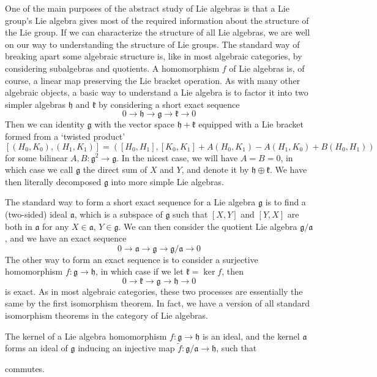 One of the main purposes of the abstract study of Lie algebras is that a Lie group's Lie algebra gives most of the required information about the structure of the Lie group. If we can characterize the structure of all Lie algebras, we are well on our way to understanding the structure of Lie groups. The standard way of breaking apart some algebraic structure is, like in most algebraic categories, by considering subalgebras and quotients. A homomorphism $f$ of Lie algebras is, of course, a linear map preserving the Lie bracket operation. As with many other algebraic objects, a basic way to understand a Lie algebra is to factor it into two simpler algebras $\mathfrak{h}$ and $\mathfrak{k}$ by considering a short exact sequence
%
\[ 0 \to \mathfrak{h} \to \mathfrak{g} \to \mathfrak{k} \to 0 \]
%
Then we can identity $\mathfrak{g}$ with the vector space $\mathfrak{h} + \mathfrak{k}$ equipped with a Lie bracket formed from a `twisted product'
%
\[ [(H_0,K_0), (H_1,K_1)] = ([H_0,H_1], [K_0,K_1] + A(H_0,K_1) - A(H_1,K_0) + B(H_0,H_1)) \]
%
for some bilinear $A,B: \mathfrak{g}^2 \to \mathfrak{g}$. In the nicest case, we will have $A = B = 0$, in which case we call $\mathfrak{g}$ the direct sum of $X$ and $Y$, and denote it by $\mathfrak{h} \oplus \mathfrak{k}$. We have then literally decomposed $\mathfrak{g}$ into more simple Lie algebras.

The standard way to form a short exact sequence for a Lie algebra $\mathfrak{g}$ is to find a (two-sided) ideal $\mathfrak{a}$, which is a subspace of $\mathfrak{g}$ such that $[X,Y]$ and $[Y,X]$ are both in $\mathfrak{a}$ for any $X \in \mathfrak{a}$, $Y \in \mathfrak{g}$. We can then consider the quotient Lie algebra $\mathfrak{g}/\mathfrak{a}$, and we have an exact sequence
%
\[ 0 \to \mathfrak{a} \to \mathfrak{g} \to \mathfrak{g}/\mathfrak{a} \to 0 \]
%
The other way to form an exact sequence is to consider a surjective homomorphism $f: \mathfrak{g} \to \mathfrak{h}$, in which case if we let $\mathfrak{k} = \ker f$, then
%
\[ 0 \to \mathfrak{k} \to \mathfrak{g} \to \mathfrak{h} \to 0 \]
%
is exact. As in most algebraic categories, these two processes are essentially the same by the first isomorphism theorem. In fact, we have a version of all standard isomorphism theorems in the category of Lie algebras.

\begin{theorem}
    The kernel of a Lie algebra homomorphism $f: \mathfrak{g} \to \mathfrak{h}$ is an ideal, and the kernel $\mathfrak{a}$ forms an ideal of $\mathfrak{g}$ inducing an injective map $\tilde{f}: \mathfrak{g}/\mathfrak{a} \to \mathfrak{h}$, such that
    \begin{center}
    \end{center}
    commutes.
\end{theorem}

